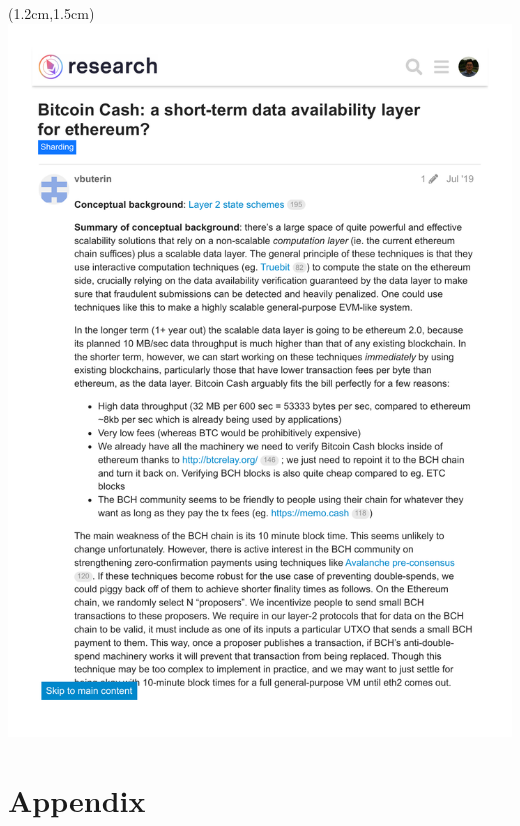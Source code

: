 \documentclass[10pt]{beamer}
\begin{document}
\begin{frame}[fragile]{}
\begin{textblock*}{10cm}(1.2cm,1.5cm)
\includegraphics[trim={0 10cm 0 2.7cm},clip,scale=0.5]{bitcoin-cash-as-da-layer.pdf}
\end{textblock*}
\end{frame}

\section{Appendix}
\end{document}

